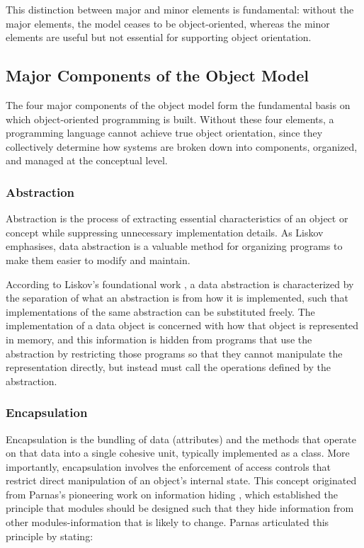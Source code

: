 This distinction between major and minor elements is fundamental: without the major elements, the model ceases to be object-oriented, whereas the minor elements are useful but not essential for supporting object orientation.


\subsection{Major Components of the Object Model}

The four major components of the object model form the fundamental basis on which object-oriented programming is built. Without these four elements, a programming language cannot achieve true object orientation, since they collectively determine how systems are broken down into components, organized, and managed at the conceptual level.

\subsubsection{Abstraction}

Abstraction is the process of extracting essential characteristics of an object or concept while suppressing unnecessary implementation details. As Liskov \cite{liskov1987keynote} emphasises, data abstraction is a valuable method for organizing programs to make them easier to modify and maintain. 

According to Liskov's foundational work \cite{liskov1987keynote}, a data abstraction is characterized by the separation of what an abstraction is from how it is implemented, such that implementations of the same abstraction can be substituted freely. The implementation of a data object is concerned with how that object is represented in memory, and this information is hidden from programs that use the abstraction by restricting those programs so that they cannot manipulate the representation directly, but instead must call the operations defined by the abstraction.

\subsubsection{Encapsulation}

Encapsulation is the bundling of data (attributes) and the methods that operate on that data into a single cohesive unit, typically implemented as a class. More importantly, encapsulation involves the enforcement of access controls that restrict direct manipulation of an object's internal state. This concept originated from Parnas's pioneering work on information hiding \cite{parnas1972criteria}, which established the principle that modules should be designed such that they hide information from other modules-information that is likely to change. Parnas \cite{parnas1972criteria} articulated this principle by stating: 

